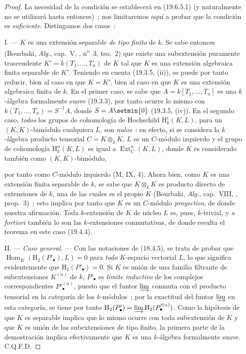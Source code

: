 \begin{proof}
La necesidad de la condición se establecerá en (19.6.5.1) (y naturalmente no
se utilizará hasta entonces)~; nos limitaremos aquí a probar que la
condición es \emph{suficiente}. Distingamos dos casos~:

I. --- $K$ es una extensión separable \emph{de tipo finito} de $k$. Se sabe
entonces (Bourbaki, \emph{Alg.}, cap.~V, ,
n\textsuperscript{o}~3, teo.~2) que existe una subextensión puramente trascendente
$K'=k(T_1,\ldots,T_n)$ de $K$ tal que $K$ es una extensión algebraica
finita separable de $K'$. Teniendo en cuenta (19.3.5, (ii)), se puede por tanto
reducir, bien al caso en que $K=K'$, bien al caso en que $K$ es una extensión algebraica finita de $k$.
En el primer caso, se sabe que $A=k[T_1,\ldots,T_n]$ es una $k$-álgebra
formalmente suave (19.3.3), por tanto ocurre lo mismo con
$k(T_1,\ldots,T_n)=S^{-1}A$, donde $S=A\setmin\{0\}$ (19.3.5, (iv)). En el segundo
caso, \emph{todos} los grupos de cohomología de Hochschild
$\mathrm H_k^i(K,L)$, para un $(K,K)$-bimódulo cualquiera $L$, son \emph{nulos}~: en
efecto, si se considera la $k$-álgebra producto tensorial $C=K\otimes_k K$,
$L$ es un $C$-módulo izquierdo y el grupo de cohomología
$\mathrm H_k^n(K,L)$ es igual a $\operatorname{Ext}_C^n(K,L)$, donde $K$ es
considerado también como $(K,K)$-bimódulo,


por tanto como $C$-módulo izquierdo (M, IX, 4). Ahora bien, como $K$ es una extensión
finita separable de $k$, se sabe que $K\otimes_k K$ es producto directo
de extensiones de $k$, una de las cuales es el propio $K$ (Bourbaki, \emph{Alg.},
cap.~VIII, , prop.~3)~; esto implica por tanto que $K$ es un
$C$-módulo \emph{proyectivo}, de donde nuestra afirmación. Toda $k$-extensión de $K$
de núcleo $L$ es, pues, $k$-trivial, y \emph{a fortiori} también lo son las
$k$-extensiones conmutativas, de donde resulta el teorema en este caso (19.4.4).

II. --- \emph{Caso general.} --- Con las notaciones de (18.4.5), se trata de
probar que $\operatorname{Hom}_K(\mathrm H_2(P'_\bullet),L)=0$ para
\emph{todo} $K$-espacio vectorial $L$, lo que significa evidentemente que
$\mathrm H_2(P'_\bullet)=0$. Si $K$ es unión de una familia filtrante de
subextensiones $K^{(\alpha)}$ de $k$, $P'_\bullet$ es \emph{límite
inductivo} de los complejos correspondientes $P'^{(\alpha)}_\bullet$, puesto que el
funtor $\varinjlim$ conmuta con el producto tensorial en la categoría de los
$k$-módulos~; por la exactitud del funtor $\varinjlim$ en esta categoría,
se tiene por tanto
$\mathrm H_2(P'_\bullet)=\varinjlim\mathrm H_2(P'^{(\alpha)}_\bullet)$.
Como la hipótesis de que $K$ es separable implica que lo mismo ocurre con toda
subextensión de $K$ y que $K$ es unión de las subextensiones de tipo finito,
la primera parte de la demostración implica efectivamente que $K$ es una
$k$-álgebra formalmente suave. C.Q.F.D.
\end{proof}

